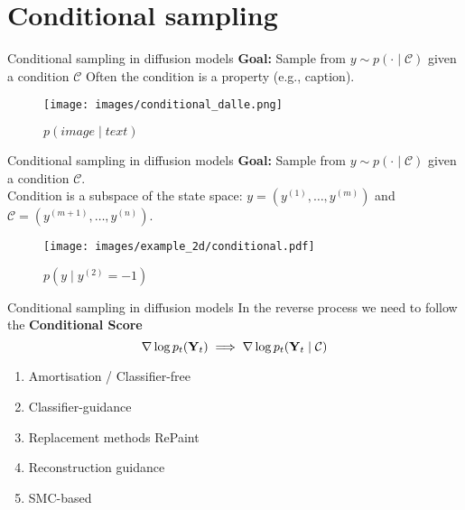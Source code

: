 

\section{Conditional sampling}

\begin{frame}{Conditional sampling in diffusion models}
\textbf{Goal:} Sample from $y \sim p(\cdot \mid \mathcal{C})$ given a condition $\mathcal{C}$
Often the condition is a property (e.g., caption).
\pause
\begin{figure}
\centering
\texttt{[image: images/conditional\_dalle.png]}
\caption{$p(image \mid text)$}
\end{figure}
\end{frame}

\begin{frame}{Conditional sampling in diffusion models}
\textbf{Goal:} Sample from $y \sim p(\cdot \mid \mathcal{C})$ given a condition $\mathcal{C}$.\\
Condition is a subspace of the state space: $y = (y^{(1)}, \ldots, y^{(m)})$ and $\mathcal{C} = (y^{(m+1)},\ldots, y^{(n)})$.
\pause
\begin{figure}
\centering
\texttt{[image: images/example\_2d/conditional.pdf]}
\caption{$p(y \mid y^{(2)} = -1)$}
\end{figure}
\end{frame}


\begin{frame}{Conditional sampling in diffusion models}
In the reverse process we need to follow the \textbf{Conditional Score}
$$
\nabla \log p_t(\mathbf{Y}_t) \implies \nabla \log p_t(\mathbf{Y}_t \mid \mathcal{C})
$$
\pause
\begin{enumerate}
    \item Amortisation / Classifier-free ~\cite{ramesh2022Hierarchical}
    \item Classifier-guidance~\cite{dhariwal2021diffusion}
    \item Replacement methods {RePaint}~\cite{lugmayr2022RePaint}
    \item Reconstruction guidance~\cite{finzi2023user}
    \item SMC-based~\cite{trippe2022Diffusion}
\end{enumerate}
\end{frame}


